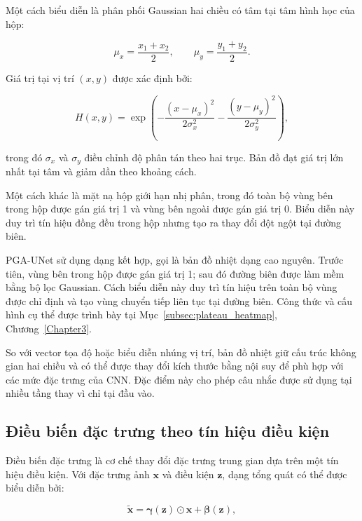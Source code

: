 Một cách biểu diễn là phân phối Gaussian hai chiều có tâm tại tâm hình học của hộp:

\begin{equation}
    \mu_x
    =
    \frac{x_1+x_2}{2},
    \qquad
    \mu_y
    =
    \frac{y_1+y_2}{2}.
\end{equation}

Giá trị tại vị trí $(x,y)$ được xác định bởi:

\begin{equation}
    H(x,y)
    =
    \exp
    \left(
        -
        \frac{(x-\mu_x)^2}{2\sigma_x^2}
        -
        \frac{(y-\mu_y)^2}{2\sigma_y^2}
    \right),
    \label{eq:gaussian_heatmap}
\end{equation}

trong đó $\sigma_x$ và $\sigma_y$ điều chỉnh độ phân tán theo hai trục. Bản đồ đạt giá trị lớn nhất tại tâm và giảm dần theo khoảng cách.

Một cách khác là mặt nạ hộp giới hạn nhị phân, trong đó toàn bộ vùng bên trong hộp được gán giá trị 1 và vùng bên ngoài được gán giá trị 0. Biểu diễn này duy trì tín hiệu đồng đều trong hộp nhưng tạo ra thay đổi đột ngột tại đường biên.

PGA-UNet sử dụng dạng kết hợp, gọi là bản đồ nhiệt dạng cao nguyên. Trước tiên, vùng bên trong hộp được gán giá trị 1; sau đó đường biên được làm mềm bằng bộ lọc Gaussian. Cách biểu diễn này duy trì tín hiệu trên toàn bộ vùng được chỉ định và tạo vùng chuyển tiếp liên tục tại đường biên. Công thức và cấu hình cụ thể được trình bày tại Mục~\ref{subsec:plateau_heatmap}, Chương~\ref{Chapter3}.

So với vector tọa độ hoặc biểu diễn nhúng vị trí, bản đồ nhiệt giữ cấu trúc không gian hai chiều và có thể được thay đổi kích thước bằng nội suy để phù hợp với các mức đặc trưng của CNN. Đặc điểm này cho phép câu nhắc được sử dụng tại nhiều tầng thay vì chỉ tại đầu vào.

\subsection{Điều biến đặc trưng theo tín hiệu điều kiện}
\label{subsec:feature_modulation}

Điều biến đặc trưng là cơ chế thay đổi đặc trưng trung gian dựa trên một tín hiệu điều kiện. Với đặc trưng ảnh $\mathbf{x}$ và điều kiện $\mathbf{z}$, dạng tổng quát có thể được biểu diễn bởi:

\begin{equation}
    \widetilde{\mathbf{x}}
    =
    \boldsymbol{\gamma}(\mathbf{z})
    \odot
    \mathbf{x}
    +
    \boldsymbol{\beta}(\mathbf{z}),
    \label{eq:feature_modulation}
\end{equation}

